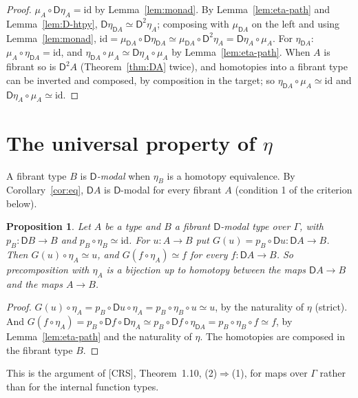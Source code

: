 \documentclass[11pt]{article}
\newcommand{\id}{\mathrm{id}}
\newcommand{\D}{\mathsf{D}}
\theoremstyle{plain}
\newtheorem{proposition}[theorem]{Proposition}
\theoremstyle{definition}
\theoremstyle{remark}
\begin{document}
\begin{proof}
$\mu_A\circ\D\eta_A=\id$ by Lemma~\ref{lem:monad}. By
Lemma~\ref{lem:eta-path} and Lemma~\ref{lem:D-htpy},
$\D\eta_{\D A}\simeq\D^2\eta_A$; composing with $\mu_{\D A}$ on the left
and using Lemma~\ref{lem:monad},
$\id=\mu_{\D A}\circ\D\eta_{\D A}\simeq\mu_{\D A}\circ\D^2\eta_A
=\D\eta_A\circ\mu_A$. For $\eta_{\D A}$: $\mu_A\circ\eta_{\D A}=\id$, and
$\eta_{\D A}\circ\mu_A\simeq\D\eta_A\circ\mu_A$ by
Lemma~\ref{lem:eta-path}. When $A$ is fibrant so is $\D^2A$
(Theorem~\ref{thm:DA} twice), and homotopies into a fibrant type can be
inverted and composed, by composition in the target; so
$\eta_{\D A}\circ\mu_A\simeq\id$ and $\D\eta_A\circ\mu_A\simeq\id$.
\end{proof}

\section{The universal property of $\eta$}\label{sec:univprop}

A fibrant type $B$ is \emph{$\D$-modal} when $\eta_B$ is a homotopy
equivalence. By Corollary~\ref{cor:eq}, $\D A$ is $\D$-modal for every
fibrant $A$ (condition 1 of the criterion below).

\begin{proposition}\label{prop:univ}
Let $A$ be a type and $B$ a fibrant $\D$-modal type over $\Gamma$, with $p_B:\D B\to
B$ and $p_B\circ\eta_B\simeq\id$. For $u:A\to B$ put $G(u)=p_B\circ\D u:
\D A\to B$. Then $G(u)\circ\eta_A\simeq u$, and $G(f\circ\eta_A)\simeq f$
for every $f:\D A\to B$. So precomposition with $\eta_A$ is a bijection up to
homotopy between the maps $\D A\to B$ and the maps $A\to B$.
\end{proposition}

\begin{proof}
$G(u)\circ\eta_A=p_B\circ\D u\circ\eta_A=p_B\circ\eta_B\circ u\simeq u$, by
the naturality of $\eta$ (strict). And
$G(f\circ\eta_A)=p_B\circ\D f\circ\D\eta_A\simeq p_B\circ\D f\circ\eta_{\D A}
=p_B\circ\eta_B\circ f\simeq f$, by Lemma~\ref{lem:eta-path} and the
naturality of $\eta$. The homotopies are composed in the fibrant type $B$.
\end{proof}

This is the argument of [CRS], Theorem~1.10, (2)$\Rightarrow$(1), for maps
over $\Gamma$ rather than for the internal function types.

\end{document}
